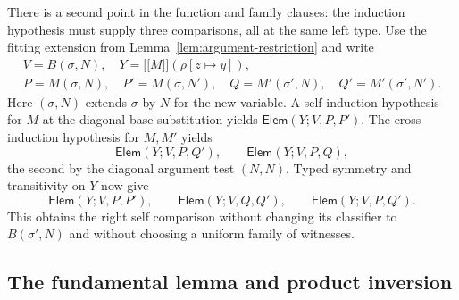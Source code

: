 \documentclass[11pt,a4paper]{article}
\theoremstyle{definition}
\theoremstyle{remark}
\newcommand{\ev}[1]{\mathopen{[\![}#1\mathclose{]\!]}}
\newcommand{\ElemRel}{\mathsf{Elem}}
\begin{document}
There is a second point in the function and family clauses: the induction
hypothesis must supply three comparisons, all at the same left type.
Use the fitting extension from Lemma~\ref{lem:argument-restriction} and
write
\[
\begin{gathered}
 V=B(\sigma,N),\quad Y=\ev M(\rho[z\mapsto y]),\\
 P=M(\sigma,N),\quad P'=M(\sigma,N'),\quad
 Q=M'(\sigma',N),\quad Q'=M'(\sigma',N').
\end{gathered}
\]
Here $(\sigma,N)$ extends $\sigma$ by $N$ for the new variable. A self
induction hypothesis for $M$ at the diagonal base substitution yields
$\ElemRel(Y;V,P,P')$.
The cross induction hypothesis for $M,M'$ yields
\[
 \ElemRel(Y;V,P,Q'),\qquad \ElemRel(Y;V,P,Q),
\]
the second by the diagonal argument test $(N,N)$.
Typed symmetry and transitivity on $Y$ now give
\begin{equation}\label{eq:three-body-comparisons}
 \ElemRel(Y;V,P,P'),\qquad
 \ElemRel(Y;V,Q,Q'),\qquad
 \ElemRel(Y;V,P,Q').
\end{equation}
This obtains the right self comparison without changing its classifier
to $B(\sigma',N)$ and without choosing a uniform family of witnesses.

\subsection{The fundamental lemma and product inversion}
\end{document}
